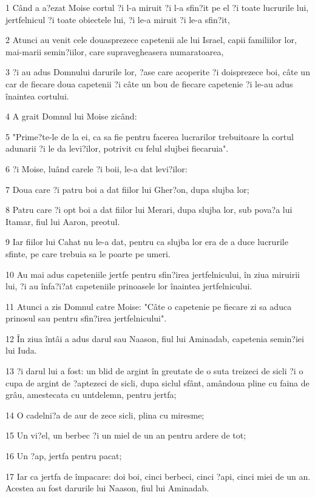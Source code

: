 \par 1 Când a a?ezat Moise cortul ?i l-a miruit ?i l-a sfin?it pe el ?i toate lucrurile lui, jertfelnicul ?i toate obiectele lui, ?i le-a miruit ?i le-a sfin?it,
\par 2 Atunci au venit cele douasprezece capetenii ale lui Israel, capii familiilor lor, mai-marii semin?iilor, care supravegheasera numaratoarea,
\par 3 ?i au adus Domnului darurile lor, ?ase care acoperite ?i doisprezece boi, câte un car de fiecare doua capetenii ?i câte un bou de fiecare capetenie ?i le-au adus înaintea cortului.
\par 4 A grait Domnul lui Moise zicând:
\par 5 "Prime?te-le de la ei, ca sa fie pentru facerea lucrarilor trebuitoare la cortul adunarii ?i le da levi?ilor, potrivit cu felul slujbei fiecaruia".
\par 6 ?i Moise, luând carele ?i boii, le-a dat levi?ilor:
\par 7 Doua care ?i patru boi a dat fiilor lui Gher?on, dupa slujba lor;
\par 8 Patru care ?i opt boi a dat fiilor lui Merari, dupa slujba lor, sub pova?a lui Itamar, fiul lui Aaron, preotul.
\par 9 Iar fiilor lui Cahat nu le-a dat, pentru ca slujba lor era de a duce lucrurile sfinte, pe care trebuia sa le poarte pe umeri.
\par 10 Au mai adus capeteniile jertfe pentru sfin?irea jertfelnicului, în ziua miruirii lui, ?i au înfa?i?at capeteniile prinoasele lor înaintea jertfelnicului.
\par 11 Atunci a zis Domnul catre Moise: "Câte o capetenie pe fiecare zi sa aduca prinosul sau pentru sfin?irea jertfelnicului".
\par 12 În ziua întâi a adus darul sau Naason, fiul lui Aminadab, capetenia semin?iei lui Iuda.
\par 13 ?i darul lui a fost: un blid de argint în greutate de o suta treizeci de sicli ?i o cupa de argint de ?aptezeci de sicli, dupa siclul sfânt, amândoua pline cu faina de grâu, amestecata cu untdelemn, pentru jertfa;
\par 14 O cadelni?a de aur de zece sicli, plina cu miresme;
\par 15 Un vi?el, un berbec ?i un miel de un an pentru ardere de tot;
\par 16 Un ?ap, jertfa pentru pacat;
\par 17 Iar ca jertfa de împacare: doi boi, cinci berbeci, cinci ?api, cinci miei de un an. Acestea au fost darurile lui Naason, fiul lui Aminadab.
